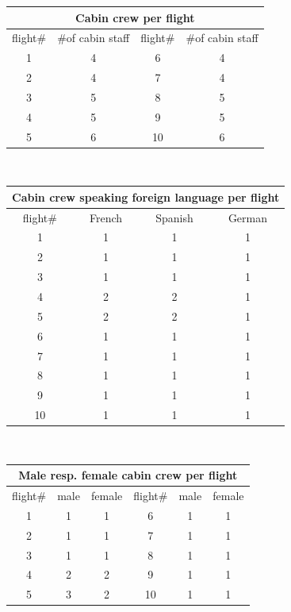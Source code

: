 \documentclass[a4paper]{scrartcl}
\begin{document}
\begin{tabular}{||c|c||c|c||}
\hline
\multicolumn{4}{||c||}{Cabin crew per flight}\\
\hline
flight$\#$ & $\#$of cabin staff & flight$\#$ & $\#$of cabin staff\\
\hline 
1 & 4 & 6 & 4\\
\hline
2 & 4 & 7 & 4 \\
\hline
3 & 5 & 8 & 5 \\
\hline
4 & 5 & 9 & 5 \\
\hline
5 & 6 & 10 & 6\\
\hline   
\end{tabular}\\[1.0cm]



\begin{tabular}{||c||c|c|c||}
\hline
\multicolumn{4}{||c||}{Cabin crew speaking foreign language per flight}\\
\hline
flight$\#$ & French  & Spanish & German \\
\hline 
1 & 1 & 1 & 1\\
\hline
2 & 1 & 1 & 1 \\
\hline
3 & 1 & 1 & 1 \\
\hline
4 & 2 & 2 & 1 \\
\hline
5 & 2 & 2 & 1\\
\hline   
6 & 1 & 1 & 1\\
\hline
7 & 1 & 1 & 1 \\
\hline
8 & 1 & 1 & 1 \\
\hline
9 & 1 & 1 & 1 \\
\hline
10 & 1 & 1 & 1\\
\hline   
\end{tabular}\\[1.0cm]


\label{table3}
\begin{tabular}{||c|c|c||c|c|c||}
\hline
\multicolumn{6}{||c||}{Male resp. female cabin crew per flight}\\
\hline
flight$\#$ & male & female & flight$\#$ & male & female\\
\hline 
1 & 1 & 1 & 6 & 1 & 1\\
\hline
2 & 1 & 1 & 7 & 1 & 1 \\
\hline
3 & 1 & 1 & 8 & 1 & 1 \\
\hline
4 & 2 & 2 & 9 & 1 & 1\\
\hline
5 & 3 & 2 & 10 & 1 & 1\\
\hline   
\end{tabular}
\end{document}
